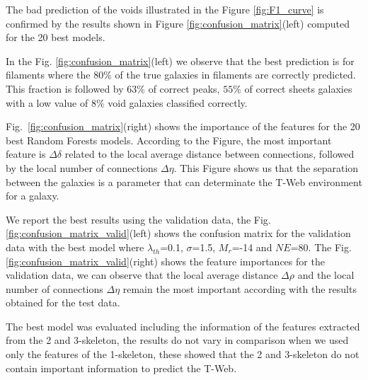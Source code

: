 \documentclass[usenatbib]{mnras}
\begin{document}
The bad prediction of the voids illustrated in the Figure
\ref{fig:F1_curve} is confirmed by the results shown in
Figure \ref{fig:confusion_matrix}(left) computed for the 20 best models.  

In the Fig. \ref{fig:confusion_matrix}(left) we observe that the best prediction is for filaments where the $80\%$ of the true galaxies in filaments are correctly predicted. 
This fraction is followed by $63\%$ of correct peaks, $55\%$ of
correct sheets galaxies with a low value of $8\%$ void galaxies
classified correctly. 

Fig.~\ref{fig:confusion_matrix}(right) shows the importance of the features
for the 20 best Random Forests models. According to the Figure, the 
most important feature is $\Delta \delta$
related to the local average distance between connections, followed by
the local number of connections $\Delta \eta$. This Figure shows
us that the separation between the galaxies is a parameter that can determinate the T-Web environment for a galaxy. 

We report the best results using the validation data, the Fig. \ref{fig:confusion_matrix_valid}(left) shows the confusion matrix for the validation data with the best model where $\lambda_{th}$=0.1, $\sigma$=1.5, $M_r$=-14 and $NE$=80. The Fig. \ref{fig:confusion_matrix_valid}(right) shows the feature importances for the validation data, we can observe that the local average distance $\Delta \rho$ and the local number of connections $\Delta \eta$ remain the most important according with the results obtained for the test data.

The best model was evaluated including the information of the features
extracted from the 2 and 3-skeleton, the results do not vary in
comparison when we used only the features of the 1-skeleton, these
showed that the 2 and 3-skeleton do not contain important information
to predict the T-Web. 
\end{document}
